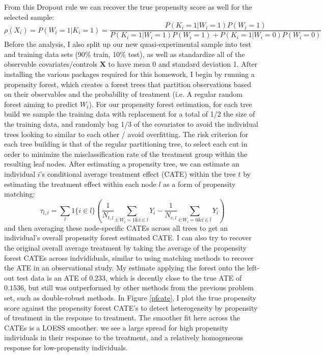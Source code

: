 \documentclass{article}
\begin{document}
From this Dropout rule we can recover the true propensity score as well for the selected sample:
\[
\rho(X_i) = P(W_i=1|K_i=1) = \frac{P(K_i=1|W_i=1)P(W_i=1) }{P(K_i=1|W_i=1)P(W_i=1) + P(K_i=1|W_i=0)P(W_i=0) }
\]
Before the analysis, I also split up our new quasi-experimental sample into test and training data sets (90\% train, 10\% test), as well as standardize all of the observable covariates/controls $\mathbf{X}$ to have mean 0 and standard deviation 1.
After installing the various packages required for this homework, I begin by running a propensity forest, which creates a forest trees that partition observations based on their observables and the probability of treatment (i.e. A regular random forest aiming to predict $W_i$). For our propensity forest estimation, for each tree build we sample the training data with replacement for a total of 1/2 the size of the training data, and randomly bag 1/3 of the covariates to avoid the individual trees looking to similar to each other / avoid overfitting. The risk criterion for each tree building is that of the regular partitioning tree, to  select each cut in order to minimize the misclassification rate of the treatment group within the resulting leaf nodes. After estimating a propensity tree, we can estimate an individual $i$'s conditional average treatment effect (CATE) within the tree $t$ by estimating the treatment effect within each node $l$ as a form of propensity matching:
\[\tau_{t,i} = \sum_{l} 1\{i\in l\} (\frac{1}{N_{t,l}}\sum_{i:W_i=1 \& i \in l} Y_i 
									- \frac{1}{N_{c,l}}\sum_{i:W_i=0 \& i \in l} Y_i) \]
and then averaging these node-specific CATEs across all trees to get an individual's overall propensity forest estimated CATE. I can also try to recover the original overall average treatment by taking the average of the propensity forest CATEs across indvididuals, similar to using matching methods to recover the ATE in an observational study. My estimate applying the forest onto the left-out test data is an ATE of $0.233$, which is decently close to the true ATE of $0.1536$, but still was outperformed by other methods from the previous problem set, such as double-robust methods. In Figure \ref{pfcate}, I plot the true propensity score against the propensity forest CATE's to detect heterogeneity by propensity of treatment in the response to treatment. The smoother fit here across the CATEs is a LOESS smoother. we see a large spread for high propensity individuals in their response to the treatment, and a relatively homogeneous response for low-propensity individuals.
\end{document}
